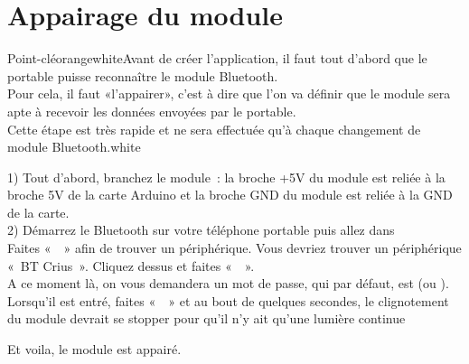 \chapter{Appairage du module} \label{appairage}

\begin{messageBox}{Point-clé}{orange}{white}{Avant de créer l'application, il faut tout d'abord que le portable puisse reconnaître le module Bluetooth.\\
Pour cela, il faut «l'appairer», c'est à dire que l'on va définir que le module sera apte à recevoir les données envoyées par le portable. \\Cette étape est très rapide et ne sera effectuée qu’à chaque changement de module Bluetooth.}{white}
\end{messageBox}

1) Tout d'abord, branchez le module : la broche +5V du module est reliée à la broche 5V de la carte Arduino et la broche GND du module est reliée à la GND de la carte. \\


2) Démarrez le Bluetooth sur votre téléphone portable puis allez dans  \\
Faites «  » afin de trouver un périphérique. 
Vous devriez trouver un périphérique « BT Crius ». Cliquez dessus et faites «  ». \\
A ce moment là, on vous demandera un mot de passe, qui par défaut, est  (ou ). \\

Lorsqu'il est entré, faites «  » et au bout de quelques secondes, le clignotement du module devrait se stopper pour qu'il n'y ait qu'une lumière continue 



Et voila, le module est appairé.